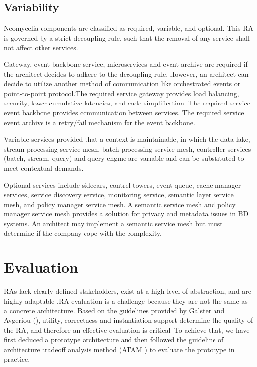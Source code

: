\documentclass[10pt, conference]{IEEEtran}
\begin{document}
\subsection{Variability}
Neomycelia components are classified as required, variable, and optional. This RA is governed by a strict decoupling rule, such that the removal of any service shall not affect other services.

Gateway, event backbone service, microservices and event archive are required if the architect decides to adhere to the decoupling rule. However, an architect can decide to utilize another method of communication like orchestrated events or point-to-point protocol.The required service gateway provides load balancing, security, lower cumulative latencies, and code simplification. The required service event backbone provides communication between services. The required service event archive is a retry/fail mechanism for the event backbone.

Variable services provided that  a context is maintainable, in which the data lake, stream processing service mesh, batch processing service mesh, controller services (batch, stream, query) and query engine are variable and can be substituted to meet contextual demands.

Optional services include sidecars, control towers, event queue, cache manager services, service discovery service, monitoring service, semantic layer service mesh, and policy manager service mesh. A semantic service mesh and policy manager service mesh provides a solution for privacy and metadata issues in BD systems. An architect may implement a semantic service mesh but must determine if the company cope with the complexity.

\section{Evaluation}

RAs lack clearly defined stakeholders, exist at a high level of abstraction, and are highly adaptable \cite{AtaeiACIS}.RA evaluation is a challenge \cite{angelov2008contracting,Avgeriou} because they are not the same as a concrete architecture. Based on the guidelines provided by Galster and Avgeriou (\cite{GALSTER}), utility, correctness and instantiation support determine the quality of the RA, and therefore an effective evaluation is critical. To achieve that, we have first deduced a prototype architecture and then followed the guideline of architecture tradeoff analysis method (ATAM \cite{KazmanATAM}) to evaluate the prototype in practice.
\end{document}
